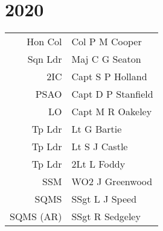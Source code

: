 \chapter*{2020}

\vspace*{10mm}

\begin{center}
  \small
  \begin{tabular}{rl}
    Hon Col & Col P M Cooper \\
    Sqn Ldr & Maj C G Seaton \\
    2IC & Capt S P Holland \\
    PSAO & Capt D P Stanfield \\
    LO & Capt M R Oakeley \\
    Tp Ldr & Lt G Bartie \\
    Tp Ldr & Lt S J Castle \\
    Tp Ldr & 2Lt L Foddy \\
    SSM & WO2 J Greenwood \\
    SQMS & SSgt L J Speed \\
    SQMS (AR) & SSgt R Sedgeley \\
  \end{tabular}
\end{center}

\vspace*{5mm}

